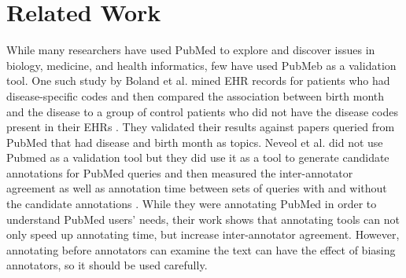 \documentclass{sig-alternate-05-2015}
\begin{document}

\section{Related Work}
While many researchers have used PubMed to explore and discover issues in biology, medicine, and health informatics, few have used PubMeb as a validation tool.
One such study by Boland et al. mined EHR records for patients who had disease-specific codes and then compared the association between birth month and the disease to a group of control patients who did not have the disease codes present in their EHRs \cite{boland2015birth}. 
They validated their results against papers queried from PubMed that had disease and birth month as topics.
Neveol  et al. did not use Pubmed as a validation tool but they did use it as a tool to generate candidate annotations for PubMed queries and then measured the inter-annotator agreement as well as annotation time between sets of queries with and without the candidate annotations \cite{neveol2011semi}. 
While they were annotating PubMed in order to understand PubMed users' needs, their work shows that annotating tools can not only speed up annotating time, but increase inter-annotator agreement.
However, annotating before annotators can examine the text can have the effect of biasing annotators, so it should be used carefully.
\end{document}
